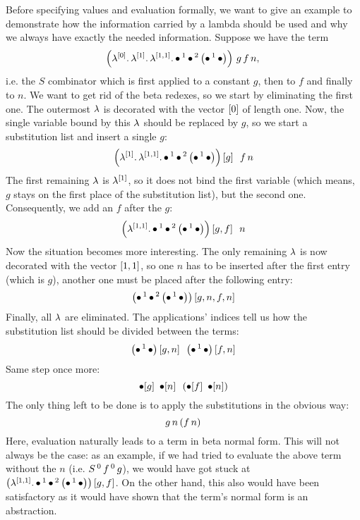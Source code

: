 \documentclass[submission,copyright,creativecommons]{eptcs}
\begin{document}
Before specifying values and evaluation formally, we want to give an example to demonstrate how the information carried by a lambda should be used and why we always have exactly the needed information. Suppose we have the term
\[
\left(\lambda ^{[0]} . \, \lambda ^{[1]} . \, \lambda ^{[1,1]} . \, \mathord{\bullet} \, ^{1} \, \mathord{\bullet} \, ^{2} \, {\left( \mathord{\bullet} \, ^{1} \, \mathord{\bullet} \right)}\right) \, g \, f \, n, \\ 
\]
i.e. the $S$ combinator which is first applied to a constant $g$, then to $f$ and finally to $n$. We want to get rid of the beta redexes, so we start by eliminating the first one. The outermost $\lambda$ is decorated with the vector $[0]$ of length one. Now, the single variable bound by this $\lambda$ should be replaced by $g$, so we start a substitution list and insert a single $g$:
\[
\left(\lambda ^{[1]} . \, \lambda ^{[1,1]} . \, \mathord{\bullet} \, ^{1} \, \mathord{\bullet} \, ^{2} \, {\left( \mathord{\bullet} \, ^{1} \, \mathord{\bullet} \right)}\right) \left[ g \right] \ \, f \, n
\]
The first remaining $\lambda$ is $\lambda^{[1]}$, so it does not bind the first variable (which means, $g$ stays on the first place of the substitution list), but the second one. Consequently, we add an $f$ after the $g$:
\[
\left(\lambda ^{[1,1]} . \, \mathord{\bullet} \, ^{1} \, \mathord{\bullet} \, ^{2} \, {\left( \mathord{\bullet} \, ^{1} \, \mathord{\bullet} \right)}\right)  \left[ g, f \right] \ \, n
\]
Now the situation becomes more interesting. The only remaining $\lambda$ is now decorated with the vector $[1,1]$, so one $n$ has to be inserted after the first entry (which is $g$), another one must be placed after the following entry:
\[
\left(\mathord{\bullet} \, ^{1} \, \mathord{\bullet} \, ^{2} \, {\left( \mathord{\bullet} \, ^{1} \, \mathord{\bullet} \right)}\right)  \left[ g, n, f, n \right]
\]
Finally, all $\lambda$ are eliminated. The applications' indices tell us how the substitution list should be divided between the terms:
\[
\left(\mathord{\bullet} \, ^{1} \, \mathord{\bullet}\right)\left[ g, n \right] \ \, \left(\mathord{\bullet} \, ^{1} \, \mathord{\bullet}\right) \left[ f, n \right]
\]
Same step once more:
\[
\mathord{\bullet}[g]  \ \, \mathord{\bullet}[n]  \ \, \left(\mathord{\bullet}[f]  \ \, \mathord{\bullet}[n]\right)
\]
The only thing left to be done is to apply the substitutions in the obvious way:
\[
g \, n  \, (f \, n)
\]
Here, evaluation naturally leads to a term in beta normal form. This will not always be the case: as an example, if we had tried to evaluate the above term without the $n$ (i.e. $S \, ^{0} \, f \, ^{0} \, g$), we would have got stuck at $\left(\lambda ^{[1,1]} . \, \mathord{\bullet} \, ^{1} \, \mathord{\bullet} \, ^{2} \, {\left( \mathord{\bullet} \, ^{1} \, \mathord{\bullet} \right)}\right)  \left[ g, f \right]$. On the other hand, this also would have been satisfactory as it would have shown that the term's normal form is an abstraction. %
\end{document}
